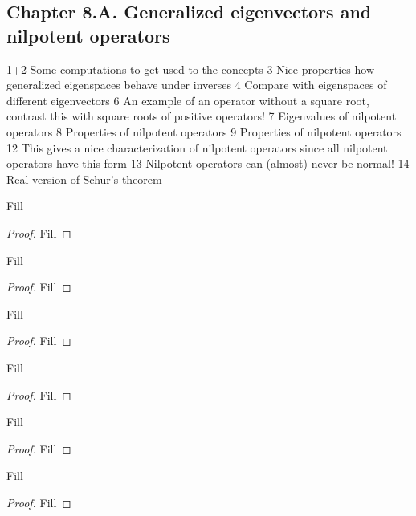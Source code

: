 \subsection*{Chapter 8.A. Generalized eigenvectors and nilpotent operators}

1+2 Some computations to get used to the concepts
3 Nice properties how generalized eigenspaces behave under inverses
4 Compare with eigenspaces of different eigenvectors
6 An example of an operator without a square root, contrast this with square roots of positive operators!
7 Eigenvalues of nilpotent operators
8 Properties of nilpotent operators 
9 Properties of nilpotent operators 
12 This gives a nice characterization of nilpotent operators since all nilpotent operators have this form 
13 Nilpotent operators can (almost) never be normal! 
14 Real version of Schur's theorem

\begin{exercise}{1}
  Fill
\end{exercise}
\begin{proof}
 Fill
\end{proof}

\begin{exercise}{2}
  Fill
\end{exercise}
\begin{proof}
 Fill
\end{proof}

\begin{exercise}{3}
  Fill
\end{exercise}
\begin{proof}
 Fill
\end{proof}

\begin{exercise}{4}
  Fill
\end{exercise}
\begin{proof}
 Fill
\end{proof}

\begin{exercise}{6}
  Fill
\end{exercise}
\begin{proof}
 Fill
\end{proof}

\begin{exercise}{7}
  Fill
\end{exercise}
\begin{proof}
 Fill
\end{proof}

